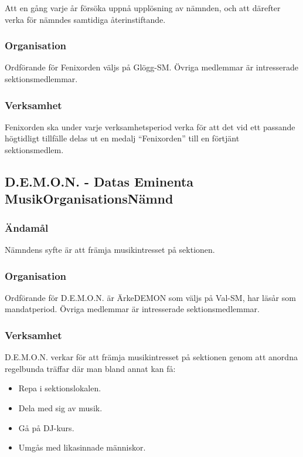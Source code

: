 \documentclass{dgovdoc}
\begin{document}
Att en gång varje år försöka uppnå upplösning av nämnden, och att därefter
verka för nämndes samtidiga återinstiftande.

\subsubsection{Organisation}

Ordförande för Fenixorden väljs på Glögg-SM. Övriga medlemmar är intresserade
sektionsmedlemmar.

\subsubsection{Verksamhet}

Fenixorden ska under varje verksamhetsperiod verka för att det vid ett passande
högtidligt tillfälle delas ut en medalj ``Fenixorden'' till en förtjänt
sektionsmedlem.

\subsection{D.E.M.O.N. - Datas Eminenta MusikOrganisationsNämnd}

\subsubsection{Ändamål}

Nämndens syfte är att främja musikintresset på sektionen.

\subsubsection{Organisation}

Ordförande för D.E.M.O.N. är ÄrkeDEMON som väljs på Val-SM, har läsår som
mandatperiod. Övriga medlemmar är intresserade sektionsmedlemmar.

\subsubsection{Verksamhet}

D.E.M.O.N. verkar för att främja musikintresset på sektionen genom att anordna
regelbunda träffar där man bland annat kan få:

\begin{itemize}
\item Repa i sektionslokalen.
\item Dela med sig av musik.
\item Gå på DJ-kurs.
\item Umgås med likasinnade människor.
\end{itemize}
\end{document}

